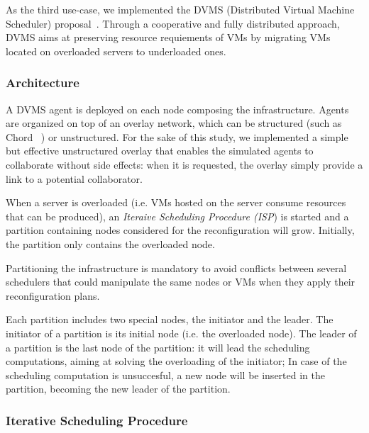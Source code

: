 As the third use-case, we implemented the DVMS
(Distributed Virtual Machine Scheduler) proposal~\cite{quesnel:cpe2012}.
Through a cooperative and fully distributed approach, DVMS aims at
preserving resource requiements of VMs by migrating VMs located on
overloaded servers to underloaded ones.


\subsubsection{Architecture}
A DVMS agent is deployed on each node composing the infrastructure.
Agents are organized on top of an overlay network, which can be structured (such as
Chord ~\cite{stoica:2001:sigcomm01}) or unstructured. For the sake of this study,
we implemented a simple but effective unstructured overlay that enables the 
simulated agents to collaborate without side effects: when it is requested, the
overlay simply provide a link to a potential collaborator. 

When a server is overloaded (i.e. VMs hosted on the server consume resources
that can be produced), an \emph{Iteraive Scheduling Procedure (ISP})  is started and a partition
containing nodes considered for the reconfiguration will grow. Initially, the
partition only contains the overloaded node.

Partitioning the infrastructure is mandatory to avoid conflicts between several
schedulers that could manipulate the same nodes or VMs when they apply their
reconfiguration plans.

Each partition includes two special nodes, the initiator and the leader.
The initiator of a partition is its initial node (i.e. the overloaded node).
The leader of a partition is the last node of the partition: it will lead the
scheduling computations, aiming at solving the overloading of the initiator;
In case of the scheduling computation is unsuccesful, a new node will be
inserted in the partition, becoming the new leader of the partition.


\subsubsection{Iterative Scheduling Procedure}

